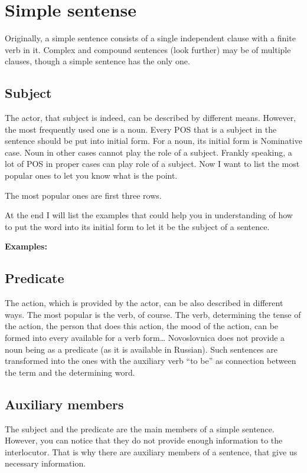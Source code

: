 \section{Simple sentense}

Originally, a simple sentence consists of a single independent clause with a finite verb in it. Complex and compound sentences (look further) may be of multiple clauses, though a simple sentence has the only one.

\subsection{Subject}
The actor, that subject is indeed, can be described by different means. However, the most frequently used one is a noun. Every POS that is a subject in the sentence should be put into initial form. For a noun, its initial form is Nominative case. Noun in other cases cannot play the role of a subject.
Frankly speaking, a lot of POS in proper cases can play role of a subject. Now I want to list the most popular ones to let you know what is the point.


The most popular ones are first three rows.

At the end I will list the examples that could help you in understanding of how to put the word into its initial form to let it be the subject of a sentence. 

\textbf{Examples:}


\subsection{Predicate}
The action, which is provided by the actor, can be also described in different ways. The most popular is the verb, of course. The verb, determining the tense of the action, the person that does this action, the mood of the action, can be formed into every available for a verb form… Novoslovnica does not provide a noun being as a predicate (as it is available in Russian). Such sentences are transformed into the ones with the auxiliary verb “to be” as connection between the term and the determining word. 

\subsection{Auxiliary members}
The subject and the predicate are the main members of a simple sentence. However, you can notice that they do not provide  enough information to the interlocutor. That is why there are auxiliary members of a sentence, that give us necessary information.

